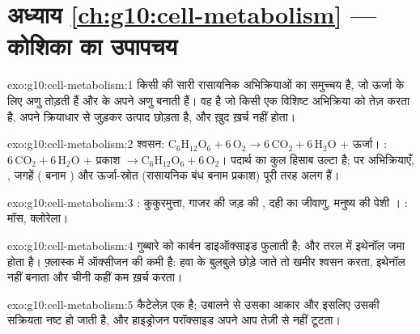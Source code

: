\section*{अध्याय \ref{ch:g10:cell-metabolism} --- कोशिका का उपापचय}

\begin{solution}{exo:g10:cell-metabolism:1}
 किसी  की सारी रासायनिक अभिक्रियाओं का समुच्चय है, जो ऊर्जा
के लिए अणु तोड़ती हैं और  के अपने अणु बनाती हैं।  वह 
है जो किसी एक विशिष्ट अभिक्रिया को तेज़ करता है, अपने क्रियाधार से जुड़कर
उत्पाद छोड़ता है, और ख़ुद ख़र्च नहीं होता।
\end{solution}

\begin{solution}{exo:g10:cell-metabolism:2}
श्वसन: $\mathrm{C_6H_{12}O_6} + 6\,\mathrm{O_2} \to
6\,\mathrm{CO_2} + 6\,\mathrm{H_2O}$ + ऊर्जा। :
$6\,\mathrm{CO_2} + 6\,\mathrm{H_2O}$ + प्रकाश $\to \mathrm{C_6H_{12}O_6}
+ 6\,\mathrm{O_2}$। पदार्थ का कुल हिसाब उल्टा है; पर अभिक्रियाएँ,
, जगहें ( बनाम ) और ऊर्जा-स्रोत (रासायनिक बंध
बनाम प्रकाश) पूरी तरह अलग हैं।
\end{solution}

\begin{solution}{exo:g10:cell-metabolism:3}
: कुकुरमुत्ता, गाजर की जड़ की , दही का जीवाणु, मनुष्य की
पेशी । : मॉस, क्लोरेला।
\end{solution}

\begin{solution}{exo:g10:cell-metabolism:4}
गुब्बारे को कार्बन डाइऑक्साइड फुलाती है; और तरल में इथेनॉल जमा होता है।
फ़्लास्क में ऑक्सीजन की कमी है: हवा के बुलबुले छोड़े जाते तो खमीर श्वसन
करता, इथेनॉल नहीं बनाता और चीनी कहीं कम ख़र्च करता।
\end{solution}

\begin{solution}{exo:g10:cell-metabolism:5}
कैटेलेज़ एक  है; उबालने से उसका आकार और इसलिए उसकी सक्रियता नष्ट
हो जाती है, और हाइड्रोजन परॉक्साइड अपने आप तेज़ी से नहीं टूटता।
\end{solution}

